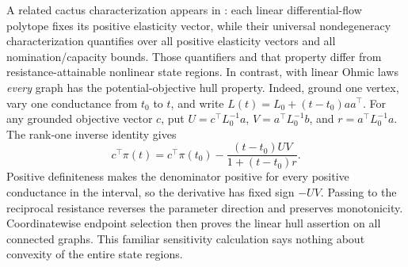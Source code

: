 A related cactus characterization appears in
\citet[Definitions 1--2 and Theorem 18 of the preprint]{brandenberg2025-differential}:
each linear differential-flow polytope fixes its positive elasticity
vector, while their universal nondegeneracy characterization quantifies
over all positive elasticity vectors and all nomination/capacity bounds.
Those quantifiers and that property differ from resistance-attainable
nonlinear state regions. In contrast, with linear Ohmic laws \emph{every}
graph has the potential-objective hull property. Indeed, ground one
vertex, vary one conductance from $t_0$ to $t$, and write
$L(t)=L_0+(t-t_0)aa^\top$. For any grounded objective vector $c$,
put $U=c^\top L_0^{-1}a$, $V=a^\top L_0^{-1}b$, and
$r=a^\top L_0^{-1}a$. The rank-one inverse identity gives
\[
 c^\top\pi(t)=c^\top\pi(t_0)
        -\frac{(t-t_0)UV}{1+(t-t_0)r}.
\]
Positive definiteness makes the denominator positive for every positive
conductance in the interval, so the derivative has fixed sign $-UV$.
Passing to the reciprocal resistance reverses the parameter direction and
preserves monotonicity. Coordinatewise endpoint selection then proves the
linear hull assertion on all connected graphs. This familiar sensitivity
calculation says nothing about convexity of the entire state regions.
